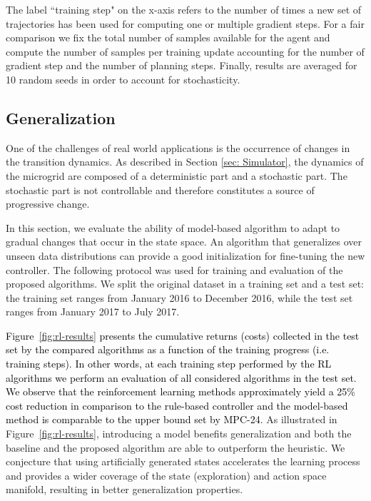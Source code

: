 \documentclass{article}
\begin{document}
The label ``training step" on the x-axis refers to the number of times a new set of trajectories has been used for computing one or multiple gradient steps. For a fair comparison we fix the total number of samples available for the agent and compute the number of samples per training update accounting for the number of gradient step and the number of planning steps. Finally, results are averaged for 10 random seeds in order to account for stochasticity.
	    
        
\subsection{Generalization}


One of the challenges of real world applications is the occurrence of changes in the transition dynamics. As described in Section \ref{sec: Simulator}, the dynamics of the microgrid are composed of a deterministic part and a stochastic part. The stochastic part is not controllable and therefore constitutes a source of progressive change. 

In this section, we evaluate the ability of model-based algorithm to adapt to gradual changes that occur in the state space. An algorithm that generalizes over unseen data distributions can provide a good initialization for fine-tuning the new controller.
The following protocol was used for training and evaluation of the proposed algorithms. We split the original dataset in a training set and a test set: the training set ranges from January 2016 to December 2016, while the test set ranges from January 2017 to July 2017. 

\textcolor{black}{Figure~\ref{fig:rl-results} presents the cumulative returns (costs) collected in the test set by the compared algorithms as a function of the training progress (i.e. training steps). In other words, at each training step performed by the RL algorithms we perform an evaluation of all considered algorithms in the test set. We observe that the reinforcement learning methods approximately yield a 25\% cost reduction in comparison to the rule-based controller and the model-based method is comparable to the upper bound set by MPC-24}. As illustrated in Figure~\ref{fig:rl-results}, introducing a model benefits generalization and both the baseline and the proposed algorithm are able to outperform the heuristic. We conjecture that using artificially generated states accelerates the learning process and provides a wider coverage of the state (exploration) and action space manifold, resulting in better generalization properties. 
\end{document}
